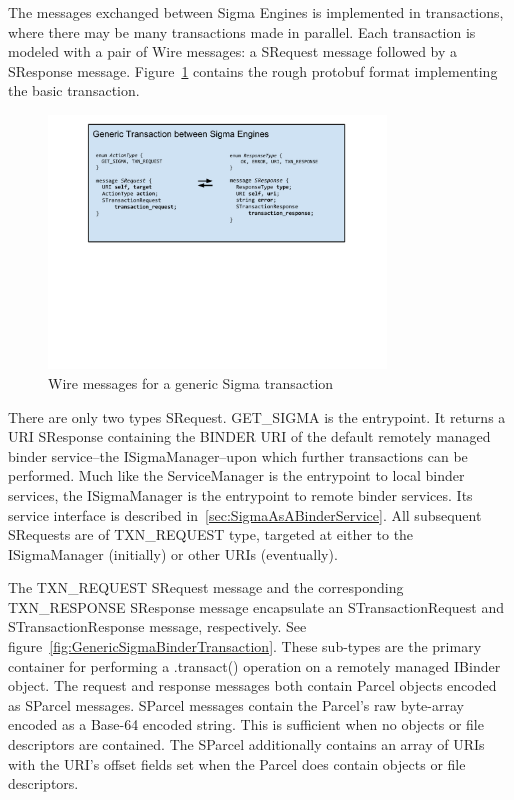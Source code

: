 \documentclass[prodmode]{acmlarge}
\begin{document}
The messages exchanged between Sigma Engines is implemented in transactions, where there may be many transactions made in parallel. Each transaction is modeled with a pair of Wire messages: a SRequest message followed by a SResponse message. Figure~\ref{fig:GenericSigmaTransaction} contains the rough protobuf format implementing the basic transaction.

\begin{figure}[h!]
\centering
\includegraphics[width=0.8\textwidth]{drawings/WireTransaction.pdf}
\caption{Wire messages for a generic Sigma transaction}
\label{fig:GenericSigmaTransaction}
\end{figure}

There are only two types SRequest. GET\_SIGMA is the entrypoint. It returns a URI SResponse containing the BINDER URI of the default remotely managed binder service--the ISigmaManager--upon which further transactions can be performed. Much like the ServiceManager is the entrypoint to local binder services, the ISigmaManager is the entrypoint to remote binder services. Its service interface is described in~\ref{sec:SigmaAsABinderService}. All subsequent SRequests are of TXN\_REQUEST type, targeted at either to the ISigmaManager (initially) or other URIs (eventually).

The TXN\_REQUEST SRequest message and the corresponding TXN\_RESPONSE SResponse message encapsulate an STransactionRequest and STransactionResponse message, respectively. See figure~\ref{fig:GenericSigmaBinderTransaction}. These sub-types are the primary container for performing a .transact() operation on a remotely managed IBinder object. The request and response messages both contain Parcel objects encoded as SParcel messages. SParcel messages contain the Parcel's raw byte-array encoded as a Base-64 encoded string. This is sufficient when no objects or file descriptors are contained. The SParcel additionally contains an array of URIs with the URI's offset fields set when the Parcel does contain objects or file descriptors.
\end{document}
